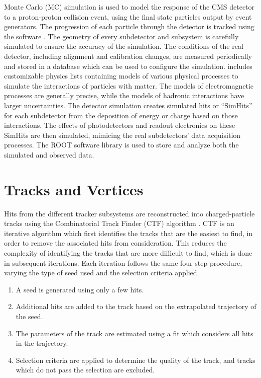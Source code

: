 \documentclass[12pt]{thesis}  %
\begin{document}
Monte Carlo (MC) simulation is used to model the response of the CMS detector to a proton-proton collision event, using the final state particles output by event generators. The progression of each particle through the detector is tracked using the \GEANTfour software \cite{geant4nim,geant4ieee}. The geometry of every subdetector and subsystem is carefully simulated to ensure the accuracy of the simulation. The conditions of the real detector, including alignment and calibration changes, are measured periodically and stored in a database which can be used to configure the simulation. \GEANTfour includes customizable physics lists containing models of various physical processes to simulate the interactions of particles with matter. The models of electromagnetic processes are generally precise, while the models of hadronic interactions have larger uncertainties. The detector simulation creates simulated hits or ``SimHits'' for each subdetector from the deposition of energy or charge based on those interactions. The effects of photodetectors and readout electronics on these SimHits are then simulated, mimicing the real subdetectors' data acquisition processes. The ROOT software library \cite{Brun199781} is used to store and analyze both the simulated and observed data.

\section{Tracks and Vertices
\label{sec:tracks}}

Hits from the different tracker subsystems are reconstructed into charged-particle tracks using the Combinatorial Track Finder (CTF) algorithm \cite{TrackingJINST}. CTF is an iterative algorithm which first identifies the tracks that are the easiest to find, in order to remove the associated hits from consideration. This reduces the complexity of identifying the tracks that are more difficult to find, which is done in subsequent iterations. Each iteration follows the same four-step procedure, varying the type of seed used and the selection criteria applied.
\begin{enumerate}
\item A seed is generated using only a few hits.
\item Additional hits are added to the track based on the extrapolated trajectory of the seed.
\item The parameters of the track are estimated using a fit which considers all hits in the trajectory.
\item Selection criteria are applied to determine the quality of the track, and tracks which do not pass the selection are excluded.
\end{enumerate}
\end{document}
